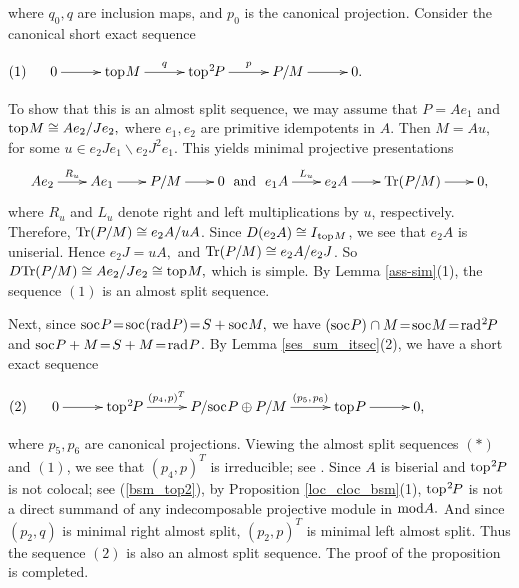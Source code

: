\documentclass[10pt]{amsart}
\theoremstyle{definition}
\newcommand{\mmod}{{\rm mod}}
\newcommand{\rad}{{\rm rad}\hspace{.5pt}}
\newcommand{\soc}{{\rm soc}\hspace{.5pt}}
\newcommand{\ntop}{{\rm top}\hspace{.5pt}}
\newcommand{\hp}{\hspace{.5pt}}
\newcommand{\vp}{\vspace{.5pt}}
\begin{document}
\noindent where $q_0, q$ are inclusion maps, and $p_0$ is the canonical projection. Consider the canonical short exact sequence 

\noindent $(1) \hspace{14pt} \xymatrixcolsep{28pt}\xymatrix{0\ar[r] & \ntop M\ar[r]^-q & \ntop^2\hspace{-1pt} P \ar[r]^-p & P/M\ar[r] & 0.}$

\vp\vp

To show that this is an almost split sequence, we may assume that $P=Ae_1$ and $\ntop M \cong Ae_2/Je_2,$ where $e_1, e_2$ are primitive idempotents in $A$. Then $M=Au,$ for some $u\in e_2Je_1\backslash e_2 J^2 e_1$. This yields minimal projective presentations \vspace{-5pt}
$$\xymatrixcolsep{20pt}\xymatrix{Ae_2 \ar[r]^{R_u} & Ae_1 \ar[r] & P/M \ar[r] & 0} \mbox{ and } \xymatrixcolsep{20pt}\xymatrix{e_1A \ar[r]^{L_u} & e_2A \ar[r] & {\rm Tr}(P/M) \ar[r] & 0,}\vspace{-5.5pt}$$ where $R_u$ and $L_u$ denote right and left multiplications by $u$, respectively. Therefore, ${\rm Tr}(P/M)\cong e_2A/uA$. \vspace{.5pt} Since $D(e_2A)\cong I_{\hp\ntop M}$, we see that $e_2A$ is uniserial. Hence $e_2J=uA,$ and ${\rm Tr}(P/M)\cong e_2A/e_2J$. So $D{\rm Tr}(P/M)\cong Ae_2/Je_2\cong \ntop M,$ which is simple. By Lemma \ref{ass-sim}(1), the sequence $(1)$ is an almost split sequence. 

Next, since $\soc P\!=\!\soc(\rad P)\!=\!S+\soc M,$ we have $(\soc P) \hp \cap M \!=\! \soc M \!=\! \rad^2\hspace{-1pt}P$ and $\soc P+M \!=\! S+M \!=\! \rad P$. By Lemma \ref{ses_sum_itsec}(2), we have a short exact sequence  

\noindent $(2) \hspace{15pt} \xymatrixcolsep{28pt}\xymatrix{0\ar[r] & \ntop^2\hspace{-1pt} P \ar[r]^-{(p_4, \hp p)^T} & P/\soc P \oplus P/M \ar[r]^-{(p_5, \hp\hp p_6)} & \ntop P\ar[r] & 0,}$ 

\noindent where $p_5, p_6$ are canonical projections. \vp Viewing the almost split sequences $(*)$ and $(1)$, we see that $(p_4,p)^T$ is irreducible; see \cite[(1.3)]{LiY}. Since $A$ is biserial and $\ntop^2\hspace{-1pt}P$ is not colocal; see (\ref{bsm_top2}), by Proposition \ref{loc_cloc_bsm}(1), \vp $\ntop^2\hspace{-1pt}P$ is not a direct summand of any indecomposable projective module in $\mmod A.$ And since $(p_2, q)$ is minimal right almost split, $(p_2,p)^T$ is minimal left almost split. Thus the sequence $(2)$ is also an almost split sequence. The proof of the proposition is completed.  
\end{document}
